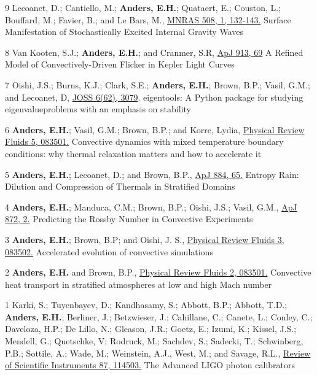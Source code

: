 \cvpub{}
	  {9}
	  {
		Lecoanet, D.; Cantiello, M.; \textbf{Anders, E.H.}; Quataert, E.; Couston, L.; Bouffard, M.; Favier, B.; and Le Bars, M.,
          \href{https://doi.org/10.1093/mnras/stab2524}{MNRAS 508, 1, 132-143.}
	  }
	  {Surface Manifestation of Stochastically Excited Internal Gravity Waves}

\cvpub{}
	  {8}
	  {
		 Van Kooten, S.J.; \textbf{Anders, E.H.}; and Cranmer, S.R,
		  \href{https://iopscience.iop.org/article/10.3847/1538-4357/abf7bf}{ApJ 913, 69}
	  }
	  {A Refined Model of Convectively-Driven Flicker in Kepler Light Curves}

\cvpub{}
	  {7}
	  {
		Oishi, J.S.; Burns, K.J.; Clark, S.E.; \textbf{Anders, E.H.}; Brown, B.P.; Vasil, G.M.; and Lecoanet, D,
		  \href{https://joss.theoj.org/papers/10.21105/joss.03079}{JOSS 6(62), 3079}.
	  }
	  {eigentools: A Python package for studying eigenvalueproblems with an emphasis on stability}

	  {6}
	  {
		  \textbf{Anders, E.H.}; Vasil, G.M.; Brown, B.P.; and Korre, Lydia, 
		  \href{https://journals.aps.org/prfluids/abstract/10.1103/PhysRevFluids.5.083501}{Physical Review Fluids 5, 083501.}
	  }
	  {Convective dynamics with mixed temperature boundary conditions: why thermal relaxation matters and how to accelerate it}

	  {5}
	  {
		  \textbf{Anders, E.H.}; Lecoanet, D.; and Brown, B.P., 
		  \href{https://iopscience.iop.org/article/10.3847/1538-4357/ab3644}{ApJ 884, 65.}
	  }
	  {Entropy Rain: Dilution and Compression of Thermals in Stratified Domains}

\cvpub{}
	  {4}
	  {
		  \textbf{Anders, E.H.}; Manduca, C.M.; Brown, B.P.; Oishi, J.S.; Vasil, G.M., 
		  \href{https://iopscience.iop.org/article/10.3847/1538-4357/aaff61}{ApJ 872, 2.}
	  }
	  {Predicting the Rossby Number in Convective Experiments}

	  {3}
	  {
		  \textbf{Anders, E.H.}; Brown, B.P; and Oishi, J. S.,
		  \href{https://journals.aps.org/prfluids/abstract/10.1103/PhysRevFluids.3.083502}{Physical Review Fluids 3, 083502.}
	  }
	  {Accelerated evolution of convective simulations}

	  {2}
	  {
		  \textbf{Anders, E.H.} and Brown, B.P.,
		  \href{https://journals.aps.org/prfluids/abstract/10.1103/PhysRevFluids.2.083501}{Physical Review Fluids 2, 083501.}
	  }
	  {Convective heat transport in stratified atmospheres at low and high Mach number}

	  {1}
	  {
			Karki, S.; Tuyenbayev, D.; Kandhasamy, S.; Abbott, B.P.; Abbott, T.D.; \textbf{Anders, E.H.};
			Berliner, J.; Betzwieser, J.; Cahillane, C.; Canete, L.; Conley, C.; Daveloza, H.P.; De Lillo, N.;
			Gleason, J.R.; Goetz, E.; Izumi, K.; Kissel, J.S.; Mendell, G.; Quetschke, V; Rodruck, M.; Sachdev, S.;
			Sadecki, T.; Schwinberg, P.B.; Sottile, A.; Wade, M.; Weinstein, A.J., West, M.; and Savage, R.L.,
			\href{https://aip.scitation.org/doi/10.1063/1.4967303}{Review of Scientific Instruments 87, 114503.}
	  }
	  {The Advanced LIGO photon calibrators}

